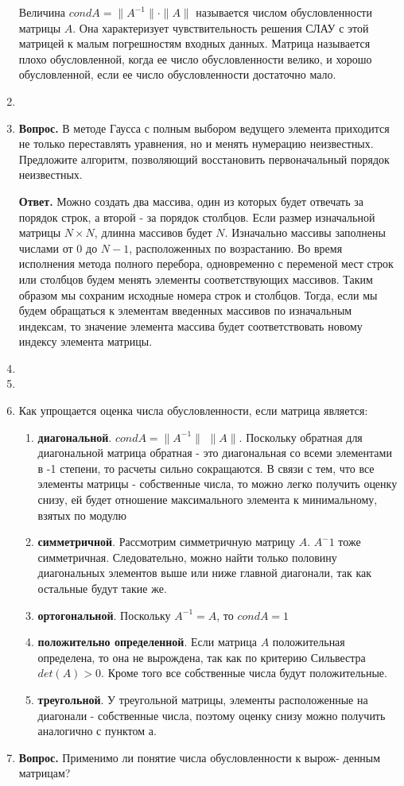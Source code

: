 \documentclass[12pt, a4paper]{article}
\begin{document}
\begin{enumerate}
	Величина $condA = \|A^{-1}\|\cdot\|A\|$  называется числом обусловленности матрицы $A$. Она характеризует чувствительность решения СЛАУ с этой матрицей к малым погрешностям входных данных. Матрица называется плохо обусловленной, когда ее число обусловленности велико, и хорошо обусловленной, если ее число обусловленности достаточно мало.
	
	\item
	\item \textbf{Вопрос.} В методе Гаусса с полным выбором ведущего элемента
	приходится не только переставлять уравнения, но и менять нумерацию неизвестных. Предложите алгоритм, позволяющий восстановить первоначальный порядок неизвестных.
	
	\textbf{Ответ.} Можно создать два массива, один из которых будет отвечать за порядок строк, а второй - за порядок столбцов. Если размер изначальной матрицы $N \times N$, длинна массивов будет $N$. Изначально массивы заполнены числами от 0 до $N - 1$, расположенных по возрастанию. Во время исполнения метода полного перебора, одновременно с переменой мест строк или столбцов будем менять элементы соответствующих массивов. Таким образом мы сохраним исходные номера строк и столбцов. Тогда, если мы будем обращаться к элементам введенных массивов по изначальным индексам, то значение элемента массива будет соответствовать новому индексу элемента матрицы.
	\item
	\item
	
	\item 
	Как упрощается оценка числа обусловленности, если матрица является:
		\begin{enumerate}
			\item \textbf{диагональной}. $cond A = \|A^{-1}\|$ $\| A \|$. Поскольку обратная для  диагональной матрица обратная - это диагональная со всеми элементами в -1 степени, то расчеты сильно сокращаются. В связи с тем, что все элементы матрицы - собственные числа, то можно легко получить оценку снизу, ей будет отношение максимального элемента к минимальному, взятых по модулю
			\item \textbf{симметричной}. Рассмотрим симметричную матрицу $A$. $A^-1$ тоже симметричная. Следовательно, можно найти только половину диагональных элементов выше или ниже главной диагонали, так как остальные будут такие же.
			\item \textbf{ортогональной}. Поскольку $A^{-1} = A$, то $cond A = 1$
			\item \textbf{положительно определенной}. Если матрица $A$ положительная определена, то она не вырождена, так как по критерию Сильвестра $det(A) > 0$. Кроме того все собственные числа будут положительные.
			\item \textbf{треугольной}. У треугольной матрицы, элементы расположенные на диагонали - собственные числа, поэтому оценку снизу можно получить аналогично с пунктом а.
		\end{enumerate}
	\item \textbf{Вопрос.} Применимо ли понятие числа обусловленности к вырож-
	денным матрицам?
	

\end{enumerate}
\end{document}
